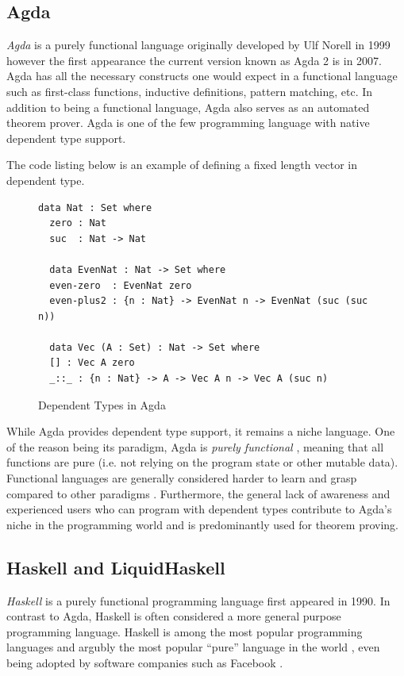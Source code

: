 \documentclass[a4paper,12pt]{report}
\begin{document}
\subsection{Agda} \label{section:agda}

\textit{Agda} \cite{agda} is a purely functional language originally developed by Ulf Norell in 
1999 however the first appearance the current version known as Agda 2 is in 
2007. Agda has all the necessary constructs one would expect in a functional 
language such as first-class functions, inductive definitions, pattern matching, 
etc. In addition to being a functional language, Agda also serves as an automated theorem prover. 
Agda is one of the few programming language with native dependent type support. 

\par
The code listing below is an example of defining a fixed length vector in 
dependent type. 

\begin{figure}[H]
  \begin{lstlisting}[mathescape=true] 
  data Nat : Set where 
  zero : Nat
  suc  : Nat -> Nat  
  
  data EvenNat : Nat -> Set where
  even-zero  : EvenNat zero
  even-plus2 : {n : Nat} -> EvenNat n -> EvenNat (suc (suc n))
  
  data Vec (A : Set) : Nat -> Set where
  [] : Vec A zero
  _::_ : {n : Nat} -> A -> Vec A n -> Vec A (suc n)
  \end{lstlisting}
  \caption{Dependent Types in Agda}
\end{figure}

\par
While Agda provides dependent type support, it remains a niche language. One of 
the reason being its paradigm, Agda is \textit{purely functional} \cite{purelyFP}, meaning that 
all functions are pure (i.e. not relying on the program state or other mutable 
data). Functional languages are generally considered harder to learn and grasp 
compared to other paradigms \cite{fpHarder}. Furthermore, the general lack of 
awareness and experienced users who can program with dependent types 
contribute to Agda's niche in the programming world and is 
predominantly used for theorem proving.

\subsection{Haskell and LiquidHaskell}
\textit{Haskell} \cite{haskell} is a purely functional programming language first appeared in 1990. In 
contrast to Agda, Haskell is often considered a more general purpose programming 
language. Haskell is among the most popular programming languages and argubly 
the most popular ``pure'' language in the world \cite{pypl}, even 
being adopted by software companies such as Facebook \cite{haskellFB}.
\end{document}
